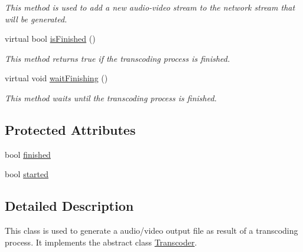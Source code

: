 \begin{DoxyCompactItemize}
\begin{DoxyCompactList}\small\item\em This method is used to add a new audio-\/video stream to the network stream that will be generated. \item\end{DoxyCompactList}\item 
virtual bool \hyperlink{classbr_1_1ufscar_1_1lince_1_1streaming_1_1AVOutputFile_a38f6acb7513f621bb7322bb31929fda0}{isFinished} ()
\begin{DoxyCompactList}\small\item\em This method returns true if the transcoding process is finished. \item\end{DoxyCompactList}\item 
virtual void \hyperlink{classbr_1_1ufscar_1_1lince_1_1streaming_1_1AVOutputFile_acd69fe24c54d43ae5add25e3917286bb}{waitFinishing} ()
\begin{DoxyCompactList}\small\item\em This method waits until the transcoding process is finished. \item\end{DoxyCompactList}\end{DoxyCompactItemize}
\subsection*{Protected Attributes}
\begin{DoxyCompactItemize}
\item 
bool \hyperlink{classbr_1_1ufscar_1_1lince_1_1streaming_1_1AVOutputFile_a05bd40f9a819e79d6e7e0c79dbe270cd}{finished}
\item 
bool \hyperlink{classbr_1_1ufscar_1_1lince_1_1streaming_1_1AVOutputFile_ab618c1df2d6a894b7959f7f9a5d3dbb0}{started}
\end{DoxyCompactItemize}


\subsection{Detailed Description}
This class is used to generate a audio/video output file as result of a transcoding process. It implements the abstract class \hyperlink{classbr_1_1ufscar_1_1lince_1_1streaming_1_1Transcoder}{Transcoder}. 


